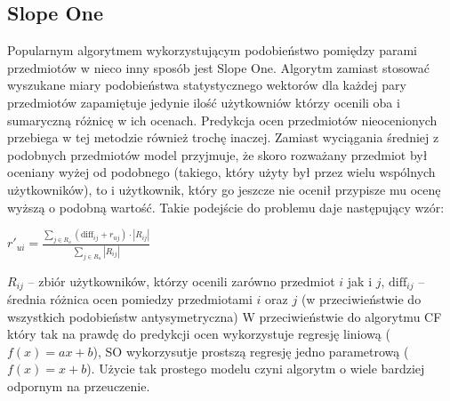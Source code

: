\documentclass{pracamgr}
\begin{document}
   \subsection{Slope One}
    Popularnym algorytmem wykorzystującym podobieństwo pomiędzy parami przedmiotów w nieco inny sposób jest Slope One.
    Algorytm zamiast stosować wyszukane miary podobieństwa statystycznego wektorów dla każdej pary przedmiotów zapamiętuje jedynie ilość
    użytkowniów którzy ocenili oba i sumaryczną różnicę w ich ocenach.\newline
    Predykcja ocen przedmiotów nieocenionych przebiega w tej metodzie również trochę inaczej.
    Zamiast wyciągania średniej z podobnych przedmiotów model przyjmuje,
    że skoro rozważany przedmiot był oceniany wyżej od podobnego (takiego, który użyty był przez wielu wspólnych użytkowników),
    to i użytkownik, który go jeszcze nie ocenił przypisze mu ocenę wyższą o podobną wartość.
    Takie podejście do problemu daje następujący wzór:\newline
    \begin{center}
     $r'_{ui}=\frac{\sum\limits_{j\in R_u}(\text{diff}_{ij}+r_{uj})\cdot|R_{ij}|}{\sum\limits_{j\in R_u}|R_{ij}|}$
    \end{center}
    {\scriptsize
     $R_{ij}$ -- zbiór użytkowników, którzy ocenili zarówno przedmiot $i$ jak i $j$,\newline
     $\text{diff}_{ij}$ -- średnia różnica ocen pomiedzy przedmiotami $i$ oraz $j$ (w przeciwieństwie do wszystkich podobieństw antysymetryczna)
    }\newline
    W przeciwieństwie do algorytmu CF który tak na prawdę do predykcji ocen wykorzystuje regresję liniową ($f(x)=ax+b$),
    SO wykorzysutje prostszą regresję jedno parametrową ($f(x)=x+b$). Użycie tak prostego modelu czyni algorytm o wiele bardziej odpornym na przeuczenie.
\end{document}
